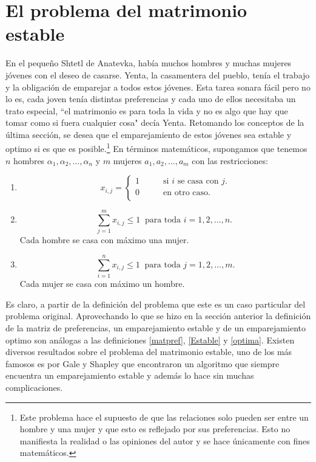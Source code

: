 \section{El problema del matrimonio estable}
En el pequeño Shtetl de Anatevka, había muchos hombres y muchas mujeres jóvenes con el deseo de casarse. Yenta, la casamentera del pueblo, tenía el trabajo y la obligación de emparejar a todos estos jóvenes. Esta tarea sonara fácil pero no lo es, cada joven tenía distintas preferencias y cada uno de ellos necesitaba un trato especial, ``el matrimonio es para toda la vida y no es algo que hay que tomar como si fuera cualquier cosa" decía Yenta. Retomando los conceptos de la última sección, se desea que el emparejamiento de estos jóvenes sea estable y optimo si es que es posible.\footnote{Este problema hace el supuesto de que las relaciones solo pueden ser entre un hombre y una mujer y que esto es reflejado por sus preferencias. Esto no manifiesta la realidad o las opiniones del autor y se hace únicamente con fines matemáticos.}
En términos matemáticos, supongamos que tenemos $n$ hombres $\alpha_1,\alpha_2,\ldots,\alpha_n$ y $m$ mujeres $a_1, a_2,\ldots,a_m$ con las restricciones:
\begin{enumerate}
\item \begin{equation} \label{1r1}
x_{i,j}= 
\begin{cases}
1 & \qquad \text{si $i$ se casa con $j$.} \\
0 &\qquad\text{en otro caso.}\ \\ 
\end{cases} \end{equation}
\item \begin{equation} \label{1r2}
\sum_{j=1}^{m}x_{i,j} \leq1 \ \text{ para toda $i=1,2,\ldots,n$. }
\end{equation} Cada hombre se casa con máximo una mujer. 
\item \begin{equation} \label{1r3}
\sum_{i=1}^{n} x_{i,j} \leq 1\ \text{ para toda $j=1,2,\dots,m$.} 
\end{equation}
Cada mujer se casa con máximo un hombre. 
\end{enumerate}

Es claro, a partir de la definición del problema que este es un caso particular del problema original. Aprovechando lo que se hizo en la sección anterior la definición de la matriz de preferencias, un emparejamiento estable y de un emparejamiento optimo son análogas a las definiciones \ref{matpref}, \ref{Estable} y \ref{optima}. Existen diversos resultados sobre el problema del matrimonio estable, uno de los más famosos es por Gale y Shapley que encontraron un algoritmo que siempre encuentra un emparejamiento estable y además lo hace sin muchas complicaciones. 

